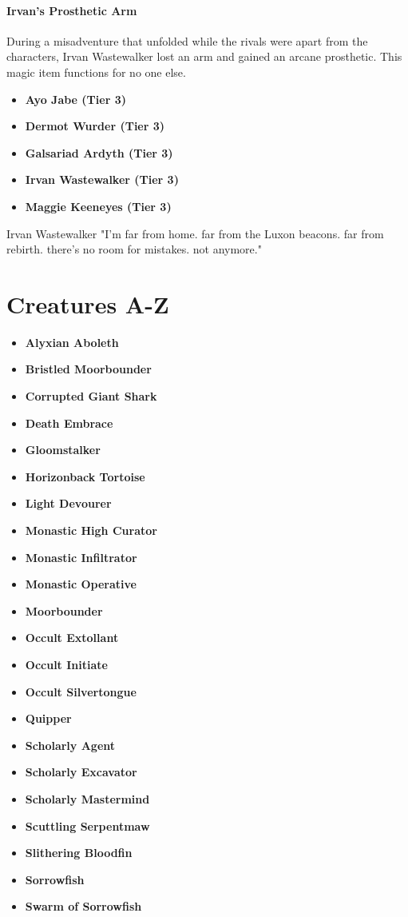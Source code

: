 \documentclass[10pt,a4,twoside,twocolumn,openany,nodeprecatedcode]{dndbook}
\begin{document}
\paragraph{Irvan's Prosthetic Arm}
During a misadventure that unfolded while the rivals were apart from the characters, Irvan Wastewalker lost an arm and gained an arcane prosthetic. This magic item functions for no one else.
\begin{itemize}

\item \textbf{Ayo Jabe (Tier 3)}
\item \textbf{Dermot Wurder (Tier 3)}
\item \textbf{Galsariad Ardyth (Tier 3)}
\item \textbf{Irvan Wastewalker (Tier 3)}
\item \textbf{Maggie Keeneyes (Tier 3)}
\end{itemize}


\begin{DndReadAloud}{Irvan Wastewalker}
"I'm far from home. far from the Luxon beacons. far from rebirth. there's no room for mistakes. not anymore."
\end{DndReadAloud}

\section{Creatures A-Z}
\begin{itemize}

\item \textbf{Alyxian Aboleth}
\item \textbf{Bristled Moorbounder}
\item \textbf{Corrupted Giant Shark}
\item \textbf{Death Embrace}
\item \textbf{Gloomstalker}
\item \textbf{Horizonback Tortoise}
\item \textbf{Light Devourer}
\item \textbf{Monastic High Curator}
\item \textbf{Monastic Infiltrator}
\item \textbf{Monastic Operative}
\item \textbf{Moorbounder}
\item \textbf{Occult Extollant}
\item \textbf{Occult Initiate}
\item \textbf{Occult Silvertongue}
\item \textbf{Quipper}
\item \textbf{Scholarly Agent}
\item \textbf{Scholarly Excavator}
\item \textbf{Scholarly Mastermind}
\item \textbf{Scuttling Serpentmaw}
\item \textbf{Slithering Bloodfin}
\item \textbf{Sorrowfish}
\item \textbf{Swarm of Sorrowfish}
\end{itemize}
\end{document}
